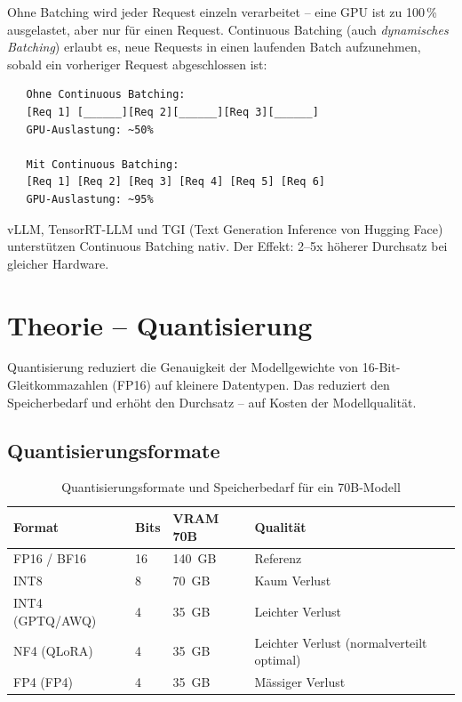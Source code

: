 Ohne Batching wird jeder Request einzeln verarbeitet -- eine GPU ist zu 100\,\% ausgelastet, aber nur für einen Request. Continuous Batching (auch \textit{dynamisches Batching}) erlaubt es, neue Requests in einen laufenden Batch aufzunehmen, sobald ein vorheriger Request abgeschlossen ist:

\begin{verbatim}
   Ohne Continuous Batching:
   [Req 1] [______][Req 2][______][Req 3][______]
   GPU-Auslastung: ~50%
   
   Mit Continuous Batching:
   [Req 1] [Req 2] [Req 3] [Req 4] [Req 5] [Req 6]
   GPU-Auslastung: ~95%
\end{verbatim}

vLLM, TensorRT-LLM und TGI (Text Generation Inference von Hugging Face) unterstützen Continuous Batching nativ. Der Effekt: 2--5x höherer Durchsatz bei gleicher Hardware.


\section{Theorie -- Quantisierung}

Quantisierung reduziert die Genauigkeit der Modellgewichte von 16-Bit-Gleitkommazahlen (FP16) auf kleinere Datentypen. Das reduziert den Speicherbedarf und erhöht den Durchsatz -- auf Kosten der Modellqualität.

\subsection{Quantisierungsformate}

\begin{table}[H]
\centering
\begin{tabularx}{\linewidth}{lXXX}
\toprule
\textbf{Format} & \textbf{Bits} & \textbf{VRAM 70B} & \textbf{Qualität} \\
\midrule
FP16 / BF16 & 16 & 140~GB & Referenz \\
INT8 & 8 & 70~GB & Kaum Verlust \\
INT4 (GPTQ/AWQ) & 4 & 35~GB & Leichter Verlust \\
NF4 (QLoRA) & 4 & 35~GB & Leichter Verlust (normalverteilt optimal) \\
FP4 (FP4) & 4 & 35~GB & Mässiger Verlust \\
\bottomrule
\end{tabularx}
\caption{Quantisierungsformate und Speicherbedarf für ein 70B-Modell}
\label{tab:quant-formats}
\end{table}

